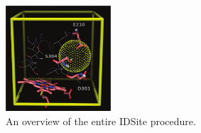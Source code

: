\begin{figure}[h]
\centering
\includegraphics[width=0.35\textwidth]{figures/idsite/glide.png}
\caption{An overview of the entire IDSite procedure.}
\label{fig:idsite_glide}
\end{figure}


